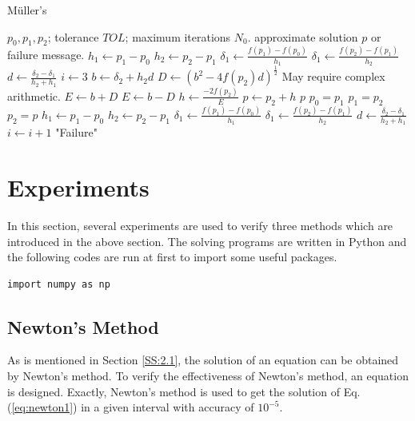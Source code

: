 \documentclass[preprint,12pt]{elsarticle}
\begin{document}
\begin{algorithm}
    \caption{M\"uller's}
    \label{algo:muller}
    \begin{algorithmic}[1]
    \Require $p_0,p_1,p_2$; tolerance $TOL$; maximum iterations $N_0$.
    \Ensure approximate solution $p$ or failure message.
    \State $h_1\gets p_1 - p_0$
    \State $h_2\gets p_2 - p_1$
    \State $\delta_1\gets \frac{f(p_1)-f(p_0)}{h_1}$
    \State $\delta_1\gets \frac{f(p_2)-f(p_1)}{h_2}$
    \State $d\gets \frac{\delta_2 - \delta_1}{h_2 + h_1}$
    \State $i\gets 3$
        \State $b\gets\delta_{2}+h_{2}d$
        \State $D\gets (b^{2}-4f(p_2)d)^{\frac{1}{2}}$
        \Comment  May require complex arithmetic.
            \State $E\gets b+D$
        \Else
            \State $E\gets b-D$
        \EndIf
        \State $h\gets\frac{-2f(p_2)}{E}$
        \State $p\gets p_{2}+h$
            \State \Return $p$
        \EndIf
        \State $p_0=p_1$
        \State $p_1=p_2$
        \State $p_2=p$
        \State $h_1\gets p_1 - p_0$
        \State $h_2\gets p_2 - p_1$
        \State $\delta_1\gets \frac{f(p_1)-f(p_0)}{h_1}$
        \State $\delta_1\gets \frac{f(p_2)-f(p_1)}{h_2}$
        \State $d\gets \frac{\delta_2 - \delta_1}{h_2 + h_1}$
        \State $i\gets i+1$
    \EndWhile
        \State \Return "Failure"
    \EndIf
    \end{algorithmic}
\end{algorithm}

\section{Experiments}
\label{S:3}

In this section, several experiments are used to verify three methods which are introduced in the above section. The solving programs are written in Python and the following codes are run at first to import some useful packages.

\begin{lstlisting}
import numpy as np
\end{lstlisting}

\subsection{Newton's Method}

As is mentioned in Section \ref{SS:2.1}, the solution of an equation can be obtained by Newton's method. To verify the effectiveness of Newton's method, an equation is designed. Exactly, Newton's method is used to get the solution of Eq. (\ref{eq:newton1}) in a given interval with accuracy of $10^{-5}$.
\end{document}
